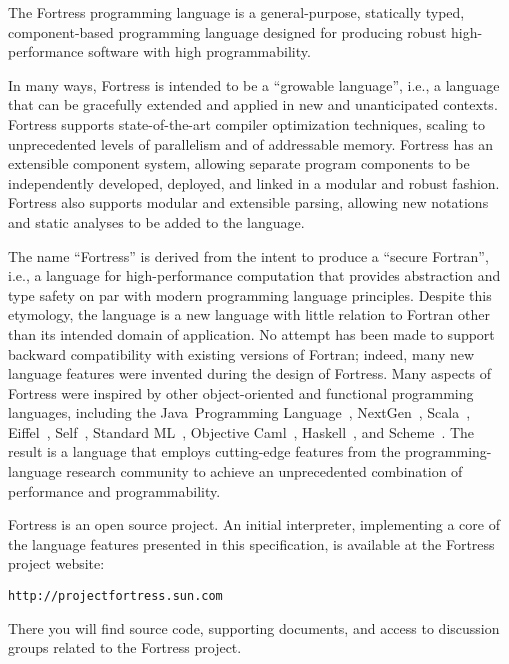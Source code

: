 %
%
%
%

The Fortress programming language is a
general-purpose,
statically typed,
component-based
programming language
designed for producing robust high-performance software
with high programmability.

In many ways, Fortress is intended to be a ``growable language'',
i.e., a language that can be gracefully extended
and applied in new and unanticipated contexts.
Fortress supports state-of-the-art compiler optimization techniques,
scaling to unprecedented levels of parallelism and of addressable memory.
Fortress has an extensible component system,
allowing separate program components
to be independently developed, deployed, and linked
in a modular and robust fashion.
Fortress also supports modular and extensible parsing,
allowing new notations and static analyses to be added to the language.

The name ``Fortress'' is derived from the intent
to produce a ``secure Fortran'',
i.e., a language for high-performance computation
that provides abstraction and type safety
on par with modern programming language principles.
Despite this etymology,
the language is a new language
with little relation to Fortran
other than its intended domain of application.
No attempt has been made to support
backward compatibility with existing versions of Fortran;
indeed, many new language features were invented
during the design of Fortress.
Many aspects of Fortress were inspired by other object-oriented and
functional programming languages, including
the Java\texttrademark\ Programming Language~\cite{JLS},
NextGen~\cite{NextGen}, Scala~\cite{Scala}, Eiffel~\cite{Eiffel},
Self~\cite{Self}, Standard ML~\cite{SML}, Objective Caml~\cite{OCaml},
Haskell~\cite{Haskell}, and Scheme~\cite{Scheme}.
The result is a language that employs cutting-edge features
from the programming-language research community
to achieve an unprecedented combination of performance and programmability.

Fortress is an open source project. An initial
interpreter, implementing a core of
the language features presented in this specification, is available
at the Fortress project website:

\begin{verbatim}
http://projectfortress.sun.com
\end{verbatim}

There you will find source code, supporting documents,
and access to discussion groups related to the Fortress project.
